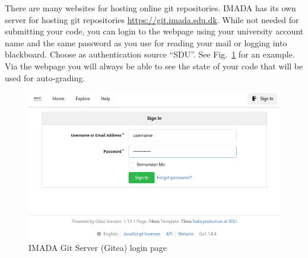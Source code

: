 There are many websites for hosting online git repositories. IMADA has its own server for hosting git repositories  \url{https://git.imada.sdu.dk}. While not needed for submitting your code, you can login to the webpage using your university account name and the same password as you use for reading your mail or logging into blackboard. Choose as authentication source ``SDU''. See Fig.~\ref{fig:gogs} for an example. Via the webpage you will always be able to see the state of your code that will be used for auto-grading.

\begin{figure}
  \includegraphics[width=\textwidth]{gitea}
  \caption{IMADA Git Server (Gitea) login page}
  \label{fig:gogs}
\end{figure}

